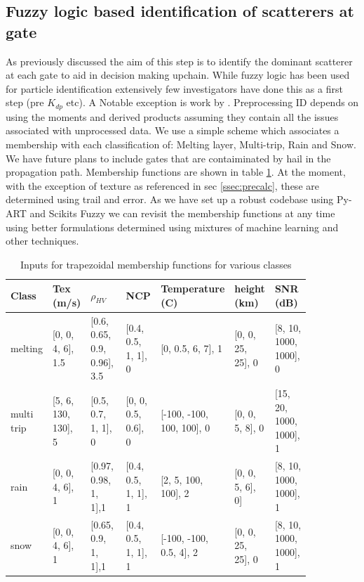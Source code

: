 \documentclass[twocol]{ametsoc}
\begin{document}
\subsection{Fuzzy logic based identification of scatterers at gate}
As previously discussed the aim of this step is to identify the dominant scatterer at each gate to aid in decision making 
upchain. While fuzzy logic has been used for particle identification extensively few investigators have done this as a first step (pre $K_{dp}$ etc). A Notable exception is work by 
  \cite{gourley_fuzzy_2007}. Preprocessing ID depends on using the moments and derived products assuming they contain all the issues associated with unprocessed data. 
  We use a simple scheme which associates a membership with each classification of: Melting layer, Multi-trip, Rain and Snow. We have future plans to include gates that are contaiminated
  by hail in the propagation path. Membership functions are shown in table \ref{tab:mbf}. At the moment, with the exception of texture as referenced in sec \ref{ssec:precalc}, these are determined using 
  trail and error. As we have set up a robust codebase using Py-ART and Scikits Fuzzy we can revisit the membership functions at any time using better formulations 
  determined using mixtures of machine learning and other techniques. 

\begin{table}[ht]
\caption{Inputs for trapezoidal membership functions for various classes }
\label{tab:mbf}
\centering
\begin{tabular}{p{0.05\linewidth}p{0.12\linewidth}p{0.16\linewidth}p{0.12\linewidth}p{0.14\linewidth}p{0.12\linewidth}p{0.14\linewidth}}
\hline
Class & Tex (m/s)& $\rho_{HV} $ &NCP & Temperature (C) &height (km)  & SNR (dB)\\
\hline
melting & [0, 0, 4, 6], 1.5& [0.6, 0.65, 0.9, 0.96], 3.5& [0.4, 0.5, 1, 1], 0& [0, 0.5, 6, 7], 1& [0, 0, 25, 25], 0& [8, 10, 1000, 1000], 0 \\
multi trip &[5, 6, 130, 130], 5&[0.5, 0.7, 1, 1], 0&[0, 0, 0.5, 0.6], 0&[-100, -100, 100, 100], 0&[0, 0, 5, 8], 0&[15, 20, 1000, 1000], 1\\
rain &[0, 0, 4, 6], 1& [0.97, 0.98, 1, 1],1& [0.4, 0.5, 1, 1], 1& [2, 5, 100, 100], 2& [0, 0, 5, 6], 0]& [8, 10, 1000, 1000], 1\\
snow &[0, 0, 4, 6], 1& [0.65, 0.9, 1, 1],1& [0.4, 0.5, 1, 1], 1& [-100, -100, 0.5, 4], 2& [0, 0, 25, 25], 0& [8, 10, 1000, 1000], 1\\
\hline
\end{tabular}
\end{table}
\end{document}
